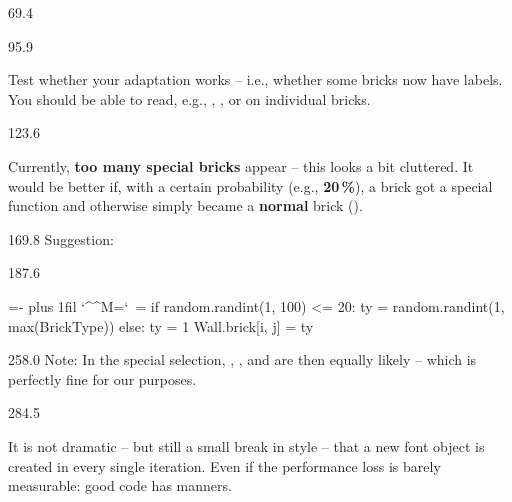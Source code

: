\documentclass{aslab}
\makeatletter
\newcommand*\kw[1]{\textcolor{codeorange}{#1}}
\newcommand*\fn[1]{\textcolor{codecyan}{#1}}
\newcommand*\num[1]{\textcolor{codered}{#1}}
\newenvironment{pycode}{\par\ttfamily\hyphenchar\font=-1
  \lineskiplimit=-\maxdimen\lineskip=0pt\parindent=0pt
  \parfillskip=0pt plus 1fil\relax
  \catcode`\^^M=\active\catcode`\ =\active\py@setup\py@gobble}{}
\makeatother
\begin{document}
\nextpage
\begin{region}{69.4}
\end{region}

\begin{region}[pitch=13.5]{95.9}
\begin{tasks}
\item Test whether your adaptation works -- i.e., whether some bricks now
  have labels. You should be able to read, e.g., ,
  , or  on individual bricks.
\end{tasks}
\end{region}

\begin{region}[pitch=14.25]{123.6}
\begin{tasks}[start=2]
\item Currently, \textbf{too many special bricks} appear -- this looks a bit
  cluttered. It would be better if, with a certain probability (e.g.,
  \textbf{20\,\%}), a brick got a special function and otherwise simply
  became a \textbf{normal} brick ().
\end{tasks}
\end{region}

\begin{region}[x=74.7]{169.8}
Suggestion:
\end{region}

\begin{region}[x=74.7,pitch=13.2]{187.6}
\begin{pycode}
\kw{if} random.randint(\num{1}, \num{100}) <= \num{20}:
    ty = random.randint(\num{1}, \fn{max}(BrickType))
\kw{else}:
    ty = \num{1}
Wall.brick[i, j] = ty
\end{pycode}
\end{region}

\begin{region}[x=74.7,right=0,pitch=13.3]{258.0}
Note: In the special selection, , , and
 are then equally likely -- which is perfectly fine for our
purposes.
\end{region}

\begin{region}[pitch=13.3]{284.5}
\begin{tasks}[start=3]
\item[3.] It is not dramatic -- but still a small break in style -- that a
  new font object is created in every single  iteration. Even
  if the performance loss is barely measurable: good code has manners.
\end{tasks}
\end{region}
\end{document}
